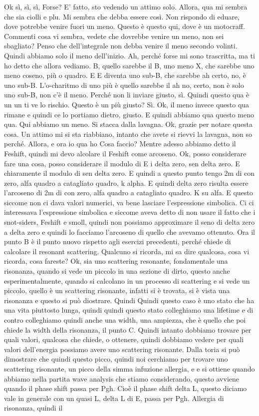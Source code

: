 \begin{soluzione}
{   Ok sì, sì, sì, Forse? E' fatto, sto vedendo un attimo solo. Allora, qua mi sembra che sia ciolli e plu. Mi sembra che debba essere così. Non rispondo di eduare, dove potrebbe venire fuori un meno. Questo è questo qui, dove è un motocraff. Commenti cosa vi sembra, vedete che dovrebbe venire un meno, non sei sbagliato? Penso che dell'integrale non debba venire il meno secondo volinti. Quindi abbiamo solo il meno dell'inizio. Ah, perché forse mi sono trascritta, ma ti ho detto che allora vediamo. B, quello sarebbe il B, uno meno X, che sarebbe uno meno coseno, più o quadro. E E diventa uno sub-B, che sarebbe ah certo, no, è uno sub-B. L'o-charitmo di uno più è quello sarebbe il ah no, certo, non è solo uno sub-B, non c'è il meno. Perché non li inviare giusto, sì. Quindi questo qua è un un ti ve lo rischio. Questo è un più giusto? Sì. Ok, il meno invece questo qua rimane e quindi ce lo portiamo dietro, giusto. E quindi abbiamo qua questo meno qua. Qui abbiamo un meno. Si stacca dalla lavagna. Ok, grazie per notare questa cosa. Un attimo mi si sta riabbiano, intanto che avete si rievvi la lavagna, non so perché. Allora, e ora io qua ho Cosa faccio? Mentre adesso abbiamo detto il Feshift, quindi mi devo alcolare il Feshift come arcoseno. Ok, posso considerare fare una cosa, posso considerare il modulo di E i delta zero, sen delta zero. E chiaramente il modulo di sen delta zero. E quindi a questo punto tengo 2m di con zero, alfa quadro a catagliato quadro, k alpha. E quindi delta zero risulta essere l'arcoseno di 2m di con zero, alfa quadro a catagliato quadro. K su alfa. E questo siccome non ci dava valori numerici, va bene lasciare l'espressione simbolica. Ci ci interessava l'espressione simbolica e siccome aveva detto di non usare il fatto che i snot-siders, Feshift e smoll, quindi non possiamo approximare il seno di delta zero a delta zero e quindi lo facciamo l'arcoseno di quello che avevamo ottenuto. Ora il punto B è il punto nuovo rispetto agli esercizi precedenti, perché chiede di calcolare il resonant scattering. Qualcuno si ricorda, mi sa dire qualcosa, cosa vi ricorda, cosa fareste? Ok, sia uno scattering resonante, fondamentale una risonanza, quando si vede un piccolo in una sezione di dirto, questo anche esperimentalmente, quando si calcolano in un processo di scattering e si vede un piccolo, quello è un scattering risonante, infatti si è trovata, si è vista una risonanza e questo si può diostrare. Quindi Quindi questo caso è uno stato che ha una vita piuttosto lunga, quindi quindi questo stato colleghiamo una lifetime e di contro colleghiamo quindi anche una width, una ampiezza, che è quello che poi chiede la width della risonanza, il punto C. Quindi intanto dobbiamo trovare per quali valori, qualcosa che chiede, o ottenere, quindi dobbiamo vedere per quali valori dell'energia possiamo avere uno scattering risonante. Dalla toria si può dimostrare che quindi questo picco, quindi noi cerchiamo per trovare uno scattering risonante, un picco della simma infuzione allergia, e e si ottiene quando abbiamo nella partita wave analysis che stiamo considerando, questo avviene quando il phase shift passa per Pgh. Cioè il phase shift delta L, questo diciamo vale in generale con un quasi L, delta L di E, passa per Pgh. Allergia di risonanza, quindi il }
\end{soluzione}
